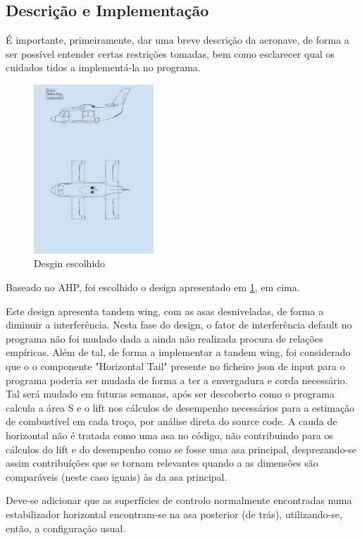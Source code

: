 \subsection{Descrição e Implementação}
É importante, primeiramente, dar uma breve descrição da aeronave, de forma a ser possível entender certas restrições tomadas, bem como esclarecer qual os cuidados tidos a implementá-la no programa.\par
\FloatBarrier
\begin{figure}[h]
    \centering
    \includegraphics[width=0.4\textwidth]{Imagens/segundodesign2.jpg}
    \caption{Desgin escolhido}
    \label{designescolhido}
\end{figure}
\FloatBarrier
Baseado no AHP, foi escolhido o design apresentado em \ref{designescolhido}, em cima.\par
Este design apresenta tandem wing, com as asas desniveladas, de forma a diminuir a interferência. Nesta fase do design, o fator de interferência default no programa não foi mudado dada a ainda não realizada procura de relações empíricas. Além de tal, de forma a implementar a tandem wing, foi considerado que o o componente "Horizontal Tail" presente no ficheiro json de input para o programa poderia ser mudada de forma a ter a envergadura e corda necessário. Tal será mudado em futuras semanas, após ser descoberto como o programa calcula a área S e o lift nos cálculos de desempenho necessários para a estimação de combustível em cada troço, por análise direta do source code. A cauda de horizontal não é tratada como uma asa no código, não contribuindo para os cálculos do lift e do desempenho como se fosse uma asa principal, desprezando-se assim contribuíções que se tornam relevantes quando a as dimensões são comparáveis (neste caso iguais) às da asa principal.\par
Deve-se adicionar que as superfícies de controlo normalmente encontradas numa estabilizador horizontal encontram-se na asa posterior (de trás), utilizando-se, então, a configuração usual.\par
